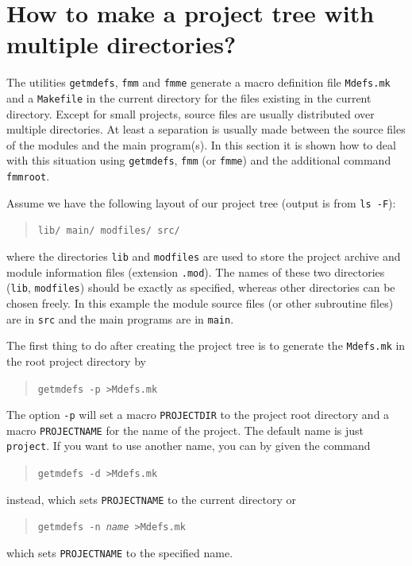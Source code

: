 
\chapter{How to make a project tree with multiple directories?}
\label{chap:projecttree}

\def\chaptertitle{How to make a project tree with multiple directories?}
\def\headdate{21st November 2023}

The utilities \texttt{getmdefs}, \texttt{fmm} and \texttt{fmme} generate a
macro definition file \texttt{Mdefs.mk} and a \texttt{Makefile} in the current
directory for the files existing in the current directory. Except for small
projects, source files are usually distributed over multiple directories. At
least a separation is usually made between the source files of the modules
and the main program(s). In this section it is shown how to deal with this
situation using \texttt{getmdefs}, \texttt{fmm} (or \texttt{fmme}) and the
additional command \texttt{fmmroot}.

Assume we have the following layout of our project tree (output is from
\texttt{ls -F}):
\begin{quote}
  \texttt{lib/  main/  modfiles/  src/}
\end{quote}
where the directories \texttt{lib} and \texttt{modfiles} are used to store the
project archive and module information files (extension \texttt{.mod}).
The names
of these two directories (\texttt{lib}, \texttt{modfiles}) should be exactly
as specified, whereas other directories can be chosen freely. In this example
the module source files (or other subroutine files) are in \texttt{src} and the
main programs are in \texttt{main}.

The first thing to do after creating the project tree is to generate the
\texttt{Mdefs.mk} in the root project directory by
\begin{quote}
   \texttt{getmdefs -p >Mdefs.mk}
\end{quote}
The option \texttt{-p} will set a macro \texttt{PROJECTDIR} to the project root
directory and a macro \texttt{PROJECTNAME} for the name of the project. The
default name is just \texttt{project}. If you want to use another name, you can
by given the command
\begin{quote}
   \texttt{getmdefs -d >Mdefs.mk}
\end{quote}
instead, which sets \texttt{PROJECTNAME} to the current directory or
\begin{quote}
   \texttt{getmdefs -n \textit{name} >Mdefs.mk}
\end{quote}
which sets \texttt{PROJECTNAME} to the specified name.


